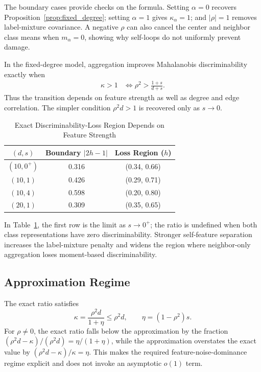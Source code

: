 The boundary cases provide checks on the formula. Setting $\alpha=0$ recovers Proposition~\ref{prop:fixed_degree}; setting $\alpha=1$ gives $\kappa_\alpha=1$; and $|\rho|=1$ removes label-mixture covariance. A negative $\rho$ can also cancel the center and neighbor class means when $m_\alpha=0$, showing why self-loops do not uniformly prevent damage.

\begin{corollary}
\label{cor:threshold}
In the fixed-degree model, aggregation improves Mahalanobis discriminability exactly when
\begin{align}
    \kappa>1
    &\iff \rho^2 > \frac{1+s}{d+s}.
\end{align}
Thus the transition depends on feature strength as well as degree and edge correlation. The simpler condition $\rho^2d>1$ is recovered only as $s\to0$.
\end{corollary}

\begin{table}[t]
\centering
\caption{Exact Discriminability-Loss Region Depends on Feature Strength}
\label{tab:threshold}
\begin{tabular}{@{}ccc@{}}
\toprule
$(d,s)$ & Boundary $|2h-1|$ & Loss Region ($h$) \\
\midrule
$(10,0^+)$ & 0.316 & (0.34, 0.66) \\
$(10,1)$ & 0.426 & (0.29, 0.71) \\
$(10,4)$ & 0.598 & (0.20, 0.80) \\
$(20,1)$ & 0.309 & (0.35, 0.65) \\
\bottomrule
\end{tabular}
\end{table}

In Table~\ref{tab:threshold}, the first row is the limit as $s\to0^+$; the ratio is undefined when both class representations have zero discriminability. Stronger self-feature separation increases the label-mixture penalty and widens the region where neighbor-only aggregation loses moment-based discriminability.

\subsection{Approximation Regime}

The exact ratio satisfies
\begin{equation}
 \kappa=\frac{\rho^2d}{1+\eta}\leq\rho^2d,
 \qquad \eta=(1-\rho^2)s.
\end{equation}
For $\rho\neq 0$, the exact ratio falls below the approximation by the fraction
$(\rho^2d-\kappa)/(\rho^2d)=\eta/(1+\eta)$, while the approximation overstates the exact value by $(\rho^2d-\kappa)/\kappa=\eta$. This makes the required feature-noise-dominance regime explicit and does not invoke an asymptotic $o(1)$ term.

